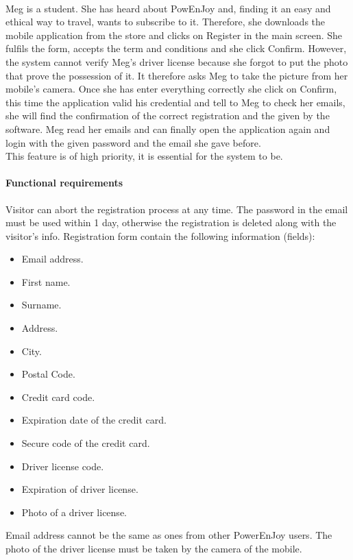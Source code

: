  \ \\
Meg is a student. She has heard about PowEnJoy and, finding it an easy and ethical way to travel, wants to subscribe to it.
Therefore, she downloads the mobile application from the store and clicks on Register in the main screen. She fulfils the form, accepts the term and conditions  and she click Confirm. However, the system cannot verify Meg's driver license because she forgot to put the photo that prove the possession of it. It therefore asks Meg to take the picture from her mobile's camera. Once she has enter everything correctly she click on Confirm, this time the application valid his credential and tell to Meg to check her emails, she will find the confirmation of the correct registration and the given by the software. Meg read her emails and can finally open the application again and login with the given password and the email she gave before.
 \ \\
This feature is of high priority, it is essential for the system to be.
\paragraph{Functional requirements}
\begin{itemize}
	 Visitor can abort the registration process at any time.
	 The password in the email must be used within 1 day, otherwise the registration is deleted along with the visitor's info.
	 Registration form contain the following information (fields):
	\begin{itemize}
		\item Email address.
		\item First name.
		\item Surname.
		\item Address.
		\item City.
		\item Postal Code.
		\item Credit card code.
		\item Expiration date of the credit card.
		\item Secure code of the credit card.
		\item Driver license code.
		\item Expiration of driver license.
		\item Photo of a driver license.
	\end{itemize}
	 Email address cannot be the same as ones from other PowerEnJoy users.
	 The photo of the driver license must be taken by the camera of the mobile.
\end{itemize}
\newpage

